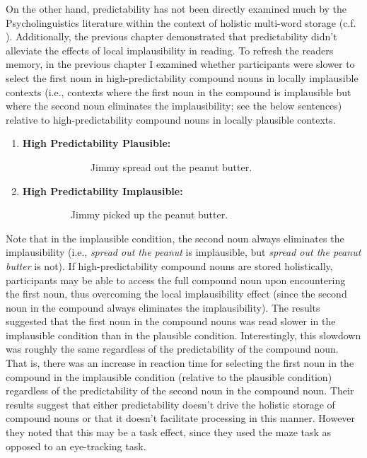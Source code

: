 \documentclass[
  12pt,
  letterpaper,
]{scrreprt}
\begin{document}
On the other hand, predictability has not been directly examined much by
the Psycholinguistics literature within the context of holistic
multi-word storage (c.f.
). Additionally, the previous chapter demonstrated that
predictability didn't alleviate the effects of local implausibility in
reading. To refresh the readers memory, in the previous chapter I
examined whether participants were slower to select the first noun in
high-predictability compound nouns in locally implausible contexts
(i.e., contexts where the first noun in the compound is implausible but
where the second noun eliminates the implausibility; see the below
sentences) relative to high-predictability compound nouns in locally
plausible contexts.

\begin{enumerate}
\def\labelenumi{\arabic{enumi}.}
\item
  \begin{description}
  \item[\textbf{High Predictability Plausible:}]
  ~~~~~~~~Jimmy spread out the peanut butter.
  \end{description}
\item
  \begin{description}
  \item[\textbf{High Predictability Implausible:}]
  ~~~~Jimmy picked up the peanut butter.
  \end{description}
\end{enumerate}

\noindent Note that in the implausible condition, the second noun always
eliminates the implausibility (i.e., \emph{spread out the peanut} is
implausible, but \emph{spread out the peanut butter} is not). If
high-predictability compound nouns are stored holistically, participants
may be able to access the full compound noun upon encountering the first
noun, thus overcoming the local implausibility effect (since the second
noun in the compound always eliminates the implausibility). The results
suggested that the first noun in the compound nouns was read slower in
the implausible condition than in the plausible condition.
Interestingly, this slowdown was roughly the same regardless of the
predictability of the compound noun. That is, there was an increase in
reaction time for selecting the first noun in the compound in the
implausible condition (relative to the plausible condition) regardless
of the predictability of the second noun in the compound noun. Their
results suggest that either predictability doesn't drive the holistic
storage of compound nouns or that it doesn't facilitate processing in
this manner. However they noted that this may be a task effect, since
they used the maze task as opposed to an eye-tracking task.
\end{document}
